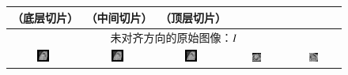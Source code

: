 \renewcommand{\captiontitle}{患有 \HCM{} 的患者的分割结果}
\begin{figure}
\begin{center}

\setlength{\tabcolsep}{1pt}

\begin{tabular}{ccccc}

\toprule
\SA{}（底层切片） & \SA{}（中间切片）& \SA{}（顶层切片） & \HLA{} & \VLA{} \\
\midrule

\multicolumn{5}{c}{未对齐方向的原始图像：$I$} \\

\includegraphics[width=0.19\textwidth]{./data/representative-results/overt/HCMNet_1100083/00_SAX/BASE/0.png} &
\includegraphics[width=0.19\textwidth]{./data/representative-results/overt/HCMNet_1100083/00_SAX/MID/0.png} &
\includegraphics[width=0.19\textwidth]{./data/representative-results/overt/HCMNet_1100083/00_SAX/APEX/0.png} &
\includegraphics[width=0.19\textwidth]{./data/representative-results/overt/HCMNet_1100367/01_HLA/00/0.png} &
\includegraphics[width=0.19\textwidth]{./data/representative-results/overt/HCMNet_1100027/02_VLA/00/0.png} \\


\end{tabular}
\end{center}
\end{figure}
